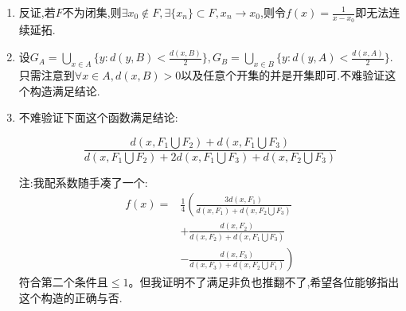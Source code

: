 \documentclass[UTF8, a4paper, 12pt, oneside, onecolumn]{article}
\numberwithin{equation}{section}
\numberwithin{figure}{section}
\numberwithin{table}{section}
\theoremstyle{nonumberplain}	%
\theoremstyle{plain}	%
\theoremstyle{plain}	%
\theoremstyle{plain}	%
\theoremstyle{plain}	%
\theoremstyle{nonumberplain}
\begin{document}
\begin{enumerate}
	\item 反证,若$F$不为闭集,则$\exists x_0\notin F,\exists\{x_n\}\subset F,x_n\rightarrow x_0$,则令$\displaystyle f(x)=\frac{1}{x-x_0}$即无法连续延拓.
	
	\item 设$\displaystyle G_A=\bigcup_{x\in A}\{y:d(y,B)<\frac{d(x,B)}{2}\},\displaystyle G_B=\bigcup_{x\in B}\{y:d(y,A)<\frac{d(x,A)}{2}\}$.只需注意到$\forall x\in A,d(x,B)>0$以及任意个开集的并是开集即可.不难验证这个构造满足结论.
	
	\item 不难验证下面这个函数满足结论:
	
	$$\frac{d(x,F_1\bigcup F_2)+d(x,F_1\bigcup F_3)}{d(x,F_1\bigcup F_2)+2d(x,F_1\bigcup F_3)+d(x,F_2\bigcup F_3)}$$
	
	注:我配系数随手凑了一个:
	\begin{align*}
		f(x)=&\displaystyle\frac{1}{4}\left( \frac{3d(x,F_1)}{d(x,F_1)+d(x,F_2\bigcup F_3)}\right.\\
		&+\frac{d(x,F_2)}{d(x,F_2)+d(x,F_1\bigcup F_3)}\\
		&-\left.\frac{d(x,F_3)}{d(x,F_3)+d(x,F_2\bigcup F_1)}  \right)
	\end{align*}
	符合第二个条件且$\leqslant 1$。但我证明不了满足非负也推翻不了,希望各位能够指出这个构造的正确与否.
\end{enumerate}

\newpage
\end{document}
